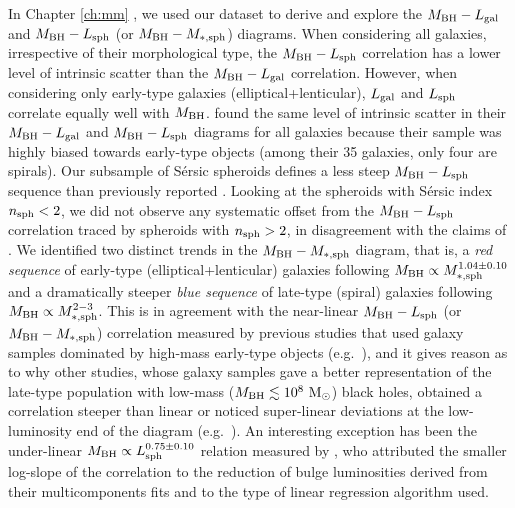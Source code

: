 In Chapter \ref{ch:mm} \citep{paperII}, we used our dataset to derive and explore 
the $M_{\rm BH} - L_{\rm gal}$ and $M_{\rm BH} - L_{\rm sph}$ (or $M_{\rm BH} - M_{\rm *,sph}$) diagrams. 
When considering all galaxies, irrespective of their morphological type, 
the $M_{\rm BH} - L_{\rm sph}$ correlation has a lower level of intrinsic scatter 
than the $M_{\rm BH} - L_{\rm gal}$ correlation. 
However, when considering only early-type galaxies (elliptical+lenticular), 
$L_{\rm gal}$ and $L_{\rm sph}$ correlate equally well with $M_{\rm BH}$. 
\citet{lasker2014anal} found the same level of intrinsic scatter in their 
$M_{\rm BH} - L_{\rm gal}$ and $M_{\rm BH} - L_{\rm sph}$ diagrams for all galaxies
because their sample was highly biased towards early-type objects 
(among their 35 galaxies, only four are spirals). 
Our subsample of S\'ersic spheroids defines a less steep $M_{\rm BH} - L_{\rm sph}$ 
sequence than previously reported \citep{grahamscott2013}. 
Looking at the spheroids with S\'ersic index $n_{\rm sph} < 2$, 
we did not observe any systematic offset 
from the $M_{\rm BH} - L_{\rm sph}$ correlation traced by spheroids with $n_{\rm sph} > 2$, 
in disagreement with the claims of \citet{sani2011}. 
We identified two distinct trends in the $M_{\rm BH} - M_{\rm *,sph}$ diagram, 
that is, a \emph{red sequence} of early-type (elliptical+lenticular) galaxies 
following $M_{\rm BH} \propto M_{\rm *,sph}^{1.04 \pm 0.10}$ 
and a dramatically steeper \emph{blue sequence} of late-type (spiral) galaxies 
following $M_{\rm BH} \propto M_{\rm *,sph}^{2-3}$. 
This is in agreement with the near-linear $M_{\rm BH} - L_{\rm sph}$ (or $M_{\rm BH} - M_{\rm *,sph}$) correlation 
measured by previous studies that used galaxy samples dominated by high-mass early-type objects 
(e.g.~\citealt{magorrian1998,marconihunt2003,haringrix2004,gultelkin2009,sani2011,beifiori2012,
erwingadotti2012,vika2012}),  
and it gives reason as to why other studies, 
whose galaxy samples gave a better representation of the late-type population 
with low-mass ($M_{\rm BH} \lesssim 10^8 \rm~M_\odot$) black holes, 
obtained a correlation steeper than linear 
or noticed super-linear deviations at the low-luminosity end of the diagram 
(e.g.~\citealt{laor1998,laor2001,wandel1999,salucci2000,ryan2007}). 
An interesting exception has been the under-linear $M_{\rm BH} \propto L_{\rm sph}^{0.75 \pm 0.10}$ relation 
measured by \citet{lasker2014anal}, 
who attributed the smaller log-slope of the correlation 
to the reduction of bulge luminosities derived from their multicomponents fits 
and to the type of linear regression algorithm used. 
